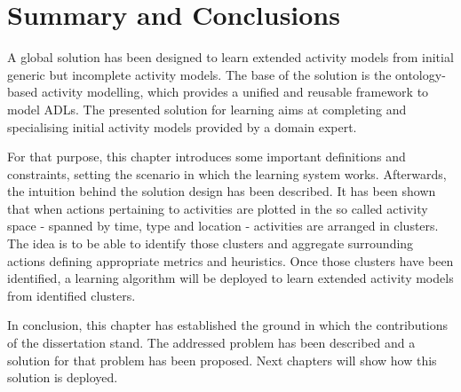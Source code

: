 \section{Summary and Conclusions}
\label{sec:approach:sum}

A global solution has been designed to learn extended activity models from initial generic but incomplete activity models. The base of the solution is the ontology-based activity modelling, which provides a unified and reusable framework to model ADLs. The presented solution for learning aims at completing and specialising initial activity models provided by a domain expert. 

For that purpose, this chapter introduces some important definitions and constraints, setting the scenario in which the learning system works. Afterwards, the intuition behind the solution design has been described. It has been shown that when actions pertaining to activities are plotted in the so called activity space - spanned by time, type and location - activities are arranged in clusters. The idea is to be able to identify those clusters and aggregate surrounding actions defining appropriate metrics and heuristics. Once those clusters have been identified, a learning algorithm will be deployed to learn extended activity models from identified clusters.

In conclusion, this chapter has established the ground in which the contributions of the dissertation stand. The addressed problem has been described and a solution for that problem has been proposed. Next chapters will show how this solution is deployed.